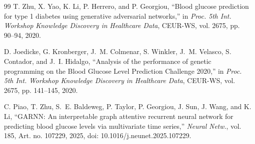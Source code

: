 \documentclass[journal]{IEEEtran}
\begin{document}
\begin{thebibliography}{99}
\label{ref65label} T. Zhu, X. Yao, K. Li, P. Herrero, and P. Georgiou, ``Blood glucose prediction for type 1 diabetes using generative adversarial networks,'' in \emph{Proc. 5th Int. Workshop Knowledge Discovery in Healthcare Data}, CEUR-WS, vol. 2675, pp. 90--94, 2020.

\label{ref70label} D. Joedicke, G. Kronberger, J.~M. Colmenar, S. Winkler, J.~M. Velasco, S. Contador, and J.~I. Hidalgo, ``Analysis of the performance of genetic programming on the Blood Glucose Level Prediction Challenge 2020,'' in \emph{Proc. 5th Int. Workshop Knowledge Discovery in Healthcare Data}, CEUR-WS, vol. 2675, pp. 141--145, 2020.

\label{ref75label} C. Piao, T. Zhu, S.~E. Baldeweg, P. Taylor, P. Georgiou, J. Sun, J. Wang, and K. Li, ``GARNN: An interpretable graph attentive recurrent neural network for predicting blood glucose levels via multivariate time series,'' \emph{Neural Netw.}, vol. 185, Art. no. 107229, 2025, doi: 10.1016/j.neunet.2025.107229.

\end{thebibliography}
\end{document}
